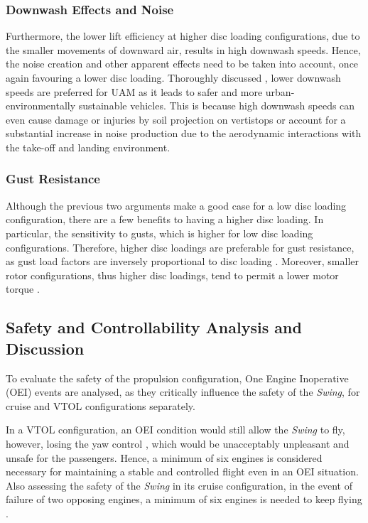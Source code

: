 \subsubsection{Downwash Effects and Noise}
Furthermore, the lower lift efficiency at higher disc loading configurations, due to the smaller movements of downward air, results in high downwash speeds.
Hence, the noise creation and other apparent effects need to be taken into account, once again favouring a lower disc loading.
Thoroughly discussed \cite{UAMroland}, lower downwash speeds are preferred for UAM as it leads to safer and more urban-environmentally sustainable vehicles.
This is because high downwash speeds can even cause damage or injuries by soil projection on vertistops or account for a substantial increase in noise production due to the aerodynamic interactions with the take-off and landing environment.

\subsubsection{Gust Resistance}
Although the previous two arguments make a good case for a low disc loading configuration, there are a few benefits to having a higher disc loading.
In particular, the sensitivity to gusts, which is higher for low disc loading configurations.
Therefore, higher disc loadings are preferable for gust resistance, as gust load factors are inversely proportional to disc loading \cite{judd1975gustdisc}.
Moreover, smaller rotor configurations, thus higher disc loadings, tend to permit a lower motor torque \cite{kadhiresan2019conceptual}.

\subsection{Safety and Controllability Analysis and Discussion}
\label{subsec:safetyengineconfig}
To evaluate the safety of the propulsion configuration, One Engine Inoperative (OEI) events are analysed, as they critically influence the safety of the \textit{Swing}, for cruise and VTOL configurations separately.

In a VTOL configuration, an OEI condition would still allow the \textit{Swing} to fly, however, losing the yaw control \cite{kang2024evaluating}, which would be unacceptably unpleasant and unsafe for the passengers.
Hence, a minimum of six engines is considered necessary for maintaining a stable and controlled flight even in an OEI situation.
Also assessing the safety of the \textit{Swing} in its cruise configuration, in the event of failure of two opposing engines, a minimum of six engines is needed to keep flying \cite{106safety}. 

